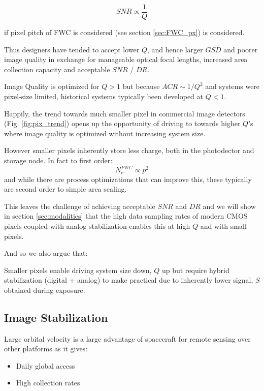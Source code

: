 \documentclass[10pt,journal]{IEEEtran}  %
\begin{document}
\begin{equation}
    SNR \propto \frac{1}{Q}
\end{equation}

if pixel pitch of FWC is considered (see section \ref{sec:FWC_px}) is considered.

Thus designers have tended to accept lower $Q$, and hence larger $GSD$ and poorer image quality in exchange for manageable optical focal lengths, increased area collection capacity and acceptable $SNR$ / $DR$.

\begin{observation}[$Q > 1$]
Image Quality is optimized for $Q>1$ but because $ACR \sim 1/Q^2$ and systems were pixel-size limited, historical systems typically been developed at $Q<1$.
\end{observation}

Happily, the trend towards much smaller pixel in commercial image detectors (Fig. \ref{fig:pix_trend}) opens up the opportunity of driving to towards higher $Q$'s where image quality is optimized without increasing system size.

However smaller pixels inherently store less charge, both in the photodector and storage node. In fact to first order\cite{jerram}:
$$N_{e^-}^{FWC} \propto p^2$$
and while there are process optimizations that can improve this, these typically are second order to simple area scaling.

This leaves the challenge of achieving acceptable $SNR$ and $DR$ and we will show in section \ref{sec:modalities} that the high data sampling rates of modern CMOS pixels coupled with analog stabilization enables this at high $Q$ and with small pixels.

And so we also argue that:
\begin{observation}
Smaller pixels enable driving system size down, $Q$ up but require hybrid stabilization (digital + analog) to make practical due to inherently lower signal, $S$ obtained during exposure.
\end{observation}

\subsection{Image Stabilization}

Large orbital velocity is a large advantage of spacecraft for remote sensing over other platforms as it gives:

\begin{itemize}
\item Daily global access
\item High collection rates
\end{itemize}
\end{document}
